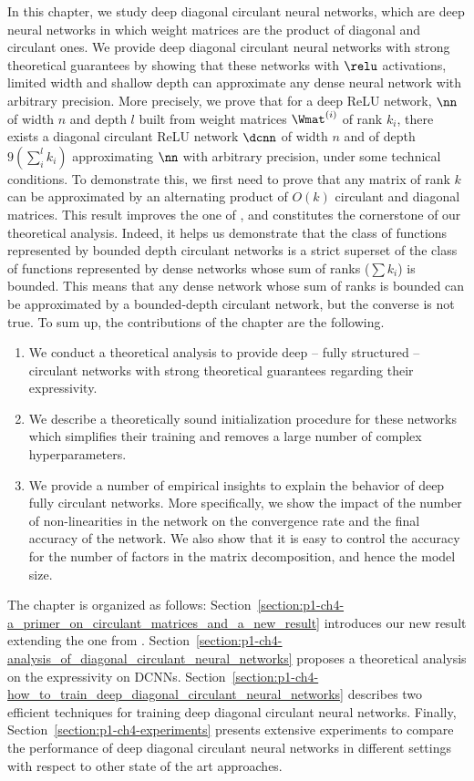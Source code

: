 In this chapter, we study deep diagonal circulant neural networks, which are deep neural networks in which weight matrices are the product of diagonal and circulant ones.
We provide deep diagonal circulant neural networks with strong theoretical guarantees by showing that these networks with $\relu$ activations, limited width and shallow depth can approximate any dense neural network with arbitrary precision.
More precisely, we prove that for a deep ReLU network, $\nn$ of width $n$ and depth $l$ built from weight matrices $\Wmat^{(i)}$ of rank $k_i$, there exists a diagonal circulant ReLU network $\dcnn$ of width $n$ and of depth $9(\sum_i^l k_i)$ approximating $\nn$ with arbitrary precision, under some technical conditions.
To demonstrate this, we first need to prove that any matrix of rank $k$ can be approximated by an alternating product of $O(k)$ circulant and diagonal matrices.
This result improves the one of \citet{huhtanen2015factoring}, and constitutes the cornerstone of our theoretical analysis.
Indeed, it helps us demonstrate that the class of functions represented by bounded depth circulant networks is a strict superset of the class of functions represented by dense networks whose sum of ranks ($\sum k_i$) is bounded.
This means that any dense network whose sum of ranks is bounded can be approximated by a bounded-depth circulant network, but the converse is not true.
To sum up, the contributions of the chapter are the following.
\begin{enumerate}
  \item We conduct a theoretical analysis to provide deep -- fully structured -- circulant networks with strong theoretical guarantees regarding their expressivity.
  \item We describe a theoretically sound initialization procedure for these networks which simplifies their training and removes a large number of complex hyperparameters. 
  \item We provide a number of empirical insights to explain the behavior of deep fully circulant networks.
    More specifically, we show the impact of the number of non-linearities in the network on the convergence rate and the final accuracy of the network.
    We also show that it is easy to control the accuracy for the number of factors in the matrix decomposition, and hence the model size.
\end{enumerate}
The chapter is organized as follows:
Section~\ref{section:p1-ch4-a_primer_on_circulant_matrices_and_a_new_result} introduces our new result extending the one from \citet{huhtanen2015factoring}.
Section~\ref{section:p1-ch4-analysis_of_diagonal_circulant_neural_networks} proposes a theoretical analysis on the expressivity on DCNNs.
Section~\ref{section:p1-ch4-how_to_train_deep_diagonal_circulant_neural_networks} describes two efficient techniques for training deep diagonal circulant neural networks.
Finally, Section~\ref{section:p1-ch4-experiments} presents extensive experiments to compare the performance of deep diagonal circulant neural networks in different settings with respect to other state of the art approaches.


